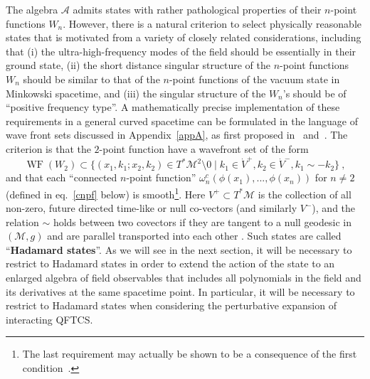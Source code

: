 \documentclass[12pt]{article}
\newcommand{\eA}{\mathscr{A}}
\newcommand{\M}{\mathscr{M}}
\DeclareMathOperator{\WF}{WF}
\theoremstyle{plain}
\theoremstyle{definition}
\def\ben{\begin{equation}}
\def\een{\end{equation}}
\begin{document}
The algebra $\eA$ admits states with rather
pathological properties of their $n$-point functions $W_n$. However, there is a natural criterion
to select physically reasonable states
that is motivated
from a variety of closely related considerations, including that (i) the ultra-high-frequency modes of the field should be essentially in their ground state, (ii) the short distance singular structure of the $n$-point functions $W_n$ should be similar to that of the $n$-point functions of the vacuum state in Minkowski spacetime, and (iii) the singular structure of the $W_n$'s
should be of ``positive frequency type''. A mathematically precise implementation of these requirements
in a general curved spacetime can be formulated in the language of wave front sets discussed in
Appendix~\ref{appA}, as first proposed in~\cite{rad1,rad2} and~\cite{bf1}. The criterion is that the $2$-point function have a wavefront set of the form
\ben\label{hadacon}
\WF(W_2) \subset \{ (x_1,k_1;x_2,k_2) \in T^*\M ^2 \setminus 0 \mid k_1 \in \dot V^+, k_2 \in \dot V^-, k_1 \sim -k_2 \} \ ,
\een
and that each ``connected $n$-point function'' $\omega^c_n(\phi(x_1),...,\phi(x_n))$ for $n\neq 2$ (defined in eq.~\eqref{cnpf} below) is smooth\footnote{
The last requirement may actually be shown to be a consequence of the first condition~\cite{sanders1}.}.
Here $V^+ \subset T^* \M$ is the collection of all non-zero, future directed
time-like or null co-vectors (and similarly $V^-$), and the relation $\sim$ holds between two covectors if they are tangent to a null geodesic 
in $(\M,g)$ and are parallel transported into
each other . Such states are called ``{\bf Hadamard states}''. As we will see in the next section, it will be necessary to restrict to Hadamard states in order to extend the action of the state
to an enlarged algebra of field observables that includes all polynomials in the field and its derivatives at the same spacetime point. In particular, it will be necessary to restrict to Hadamard states when
considering the perturbative expansion of
interacting QFTCS.
\end{document}
